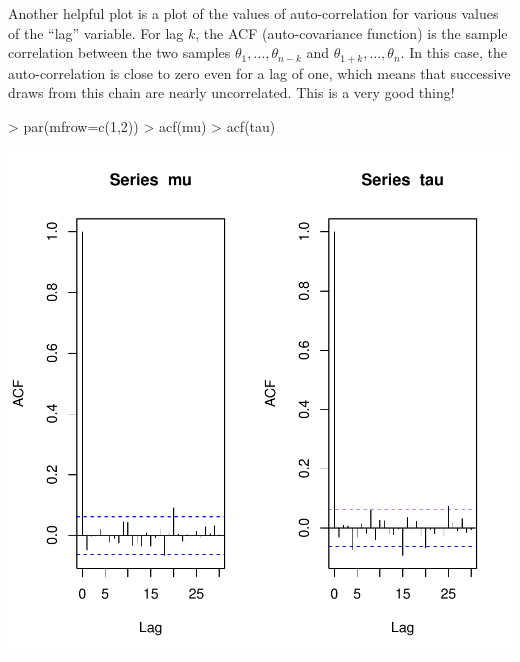 \documentclass{article}
\begin{document}
Another helpful plot is a plot of the values of auto-correlation for various values of the 
``lag'' variable.  For lag $k$, the ACF (auto-covariance function) is the sample correlation
between the two samples $\theta_1, \ldots, \theta_{n-k}$ and $\theta_{1+k}, \ldots, \theta_n$.
In this case, the auto-correlation is close to zero even for a lag of one, which means that 
successive draws from this chain are nearly uncorrelated.  This is a very good thing! 
\begin{Schunk}
\begin{Sinput}
> par(mfrow=c(1,2))
> acf(mu)
> acf(tau)
\end{Sinput}
\end{Schunk}
\includegraphics{MCMCexample-006}
\end{document}
